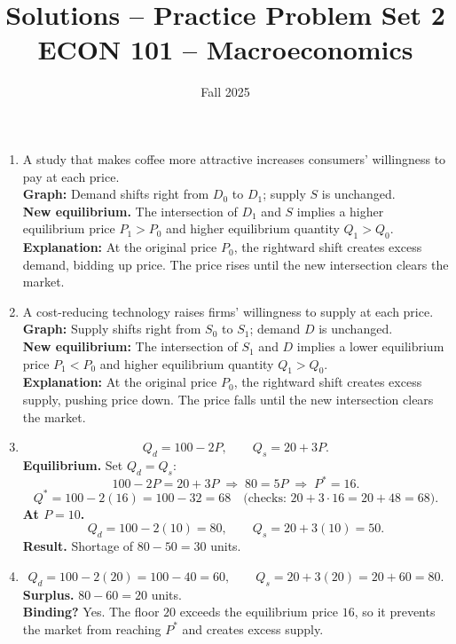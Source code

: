 \documentclass[12pt]{article}
\title{Solutions -- Practice Problem Set 2\\ \vspace{15pt} \large ECON 101 -- Macroeconomics}
\author{}
\date{Fall 2025}
\begin{document}
\maketitle



\begin{enumerate}

\item
A study that makes coffee more attractive increases consumers' willingness to pay at each price.\\
\textbf{Graph:} Demand shifts right from $D_0$ to $D_1$; supply $S$ is unchanged.\\
\textbf{New equilibrium.} The intersection of $D_1$ and $S$ implies a higher equilibrium price $P_1>P_0$ and higher equilibrium quantity $Q_1>Q_0$.\\
\textbf{Explanation:} At the original price $P_0$, the rightward shift creates excess demand, bidding up price. The price rises until the new intersection clears the market.

\item
 A cost-reducing technology raises firms' willingness to supply at each price.\\
\textbf{Graph:} Supply shifts right from $S_0$ to $S_1$; demand $D$ is unchanged.\\
\textbf{New equilibrium:} The intersection of $S_1$ and $D$ implies a lower equilibrium price $P_1<P_0$ and higher equilibrium quantity $Q_1>Q_0$.\\
\textbf{Explanation:} At the original price $P_0$, the rightward shift creates excess supply, pushing price down. The price falls until the new intersection clears the market.

\item
\[
Q_d=100-2P, \qquad Q_s=20+3P.
\]
\textbf{Equilibrium.} Set $Q_d=Q_s$:
\[
100-2P=20+3P \;\Rightarrow\; 80=5P \;\Rightarrow\; P^\ast=16.
\]
\[
Q^\ast=100-2(16)=100-32=68 \quad \text{(checks: }20+3\cdot 16=20+48=68\text{)}.
\]
\textbf{At $P=10$.} 
\[
Q_d=100-2(10)=80, \qquad Q_s=20+3(10)=50.
\]
\textbf{Result.} \;Shortage of $80-50=30$ units.

\item
\[
Q_d=100-2(20)=100-40=60, \qquad Q_s=20+3(20)=20+60=80.
\]
\textbf{Surplus.} \; $80-60=20$ units.\\
\textbf{Binding?} Yes. The floor $20$ exceeds the equilibrium price $16$, so it prevents the market from reaching $P^\ast$ and creates excess supply.


\end{enumerate}
\end{document}
